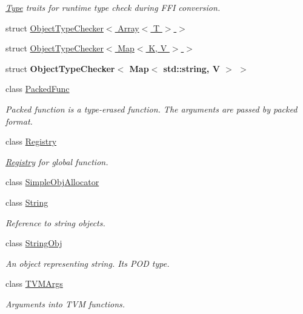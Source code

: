 \begin{DoxyCompactItemize}
\begin{DoxyCompactList}\small\item\em \hyperlink{classtvm_1_1Type}{Type} traits for runtime type check during F\+FI conversion. \end{DoxyCompactList}\item 
struct \hyperlink{structtvm_1_1runtime_1_1ObjectTypeChecker_3_01Array_3_01T_01_4_01_4}{Object\+Type\+Checker$<$ Array$<$ T $>$ $>$}
\item 
struct \hyperlink{structtvm_1_1runtime_1_1ObjectTypeChecker_3_01Map_3_01K_00_01V_01_4_01_4}{Object\+Type\+Checker$<$ Map$<$ K, V $>$ $>$}
\item 
struct {\bfseries Object\+Type\+Checker$<$ Map$<$ std\+::string, V $>$ $>$}
\item 
class \hyperlink{classtvm_1_1runtime_1_1PackedFunc}{Packed\+Func}
\begin{DoxyCompactList}\small\item\em Packed function is a type-\/erased function. The arguments are passed by packed format. \end{DoxyCompactList}\item 
class \hyperlink{classtvm_1_1runtime_1_1Registry}{Registry}
\begin{DoxyCompactList}\small\item\em \hyperlink{classtvm_1_1runtime_1_1Registry}{Registry} for global function. \end{DoxyCompactList}\item 
class \hyperlink{classtvm_1_1runtime_1_1SimpleObjAllocator}{Simple\+Obj\+Allocator}
\item 
class \hyperlink{classtvm_1_1runtime_1_1String}{String}
\begin{DoxyCompactList}\small\item\em Reference to string objects. \end{DoxyCompactList}\item 
class \hyperlink{classtvm_1_1runtime_1_1StringObj}{String\+Obj}
\begin{DoxyCompactList}\small\item\em An object representing string. It\textquotesingle{}s P\+OD type. \end{DoxyCompactList}\item 
class \hyperlink{classtvm_1_1runtime_1_1TVMArgs}{T\+V\+M\+Args}
\begin{DoxyCompactList}\small\item\em Arguments into T\+VM functions. \end{DoxyCompactList}\item 

\end{DoxyCompactItemize}
